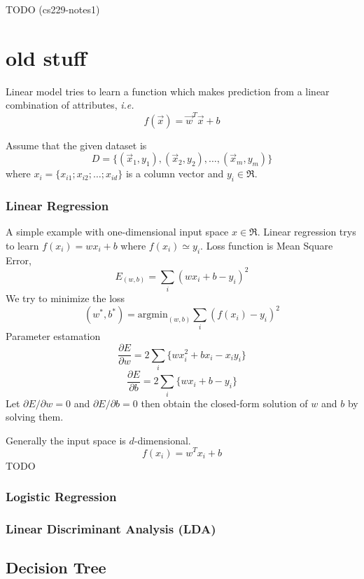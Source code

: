 TODO (cs229-notes1)

\section{old stuff}



 Linear model tries to learn a function which makes prediction from
 a linear combination of attributes, {\it i.e.}
 $$ f(\vec{x}) = \vec{w}^T \vec{x} + b $$

 Assume that the given dataset is
 $$D = \{(\vec{x}_1, y_1), (\vec{x}_2, y_2), \ldots, (\vec{x}_m, y_m)\} $$
 where $x_i=\{x_{i1};x_{i2};\ldots;x_{id}\}$ is a column vector and $y_i \in \Re$.

 \subsubsection{Linear Regression}

 A simple example with one-dimensional input space $x \in \Re$.
 Linear regression trys to learn $f(x_i)=wx_i+b$ where $f(x_i)\simeq y_i$.
 Loss function is Mean Square Error,
 $$E_{(w,b)}=\sum_i (wx_i + b - y_i)^2 $$
 We try to minimize the loss
 $$(w^*,b^*) = \text{argmin}_{(w,b)} \sum_i (f(x_i) - y_i)^2$$
 Parameter estamation
 $$\frac{\partial E}{\partial w} = 2\sum_i \{ wx_i^2 +bx_i -x_iy_i\}$$
 $$\frac{\partial E}{\partial b} = 2\sum_i \{ wx_i   +b    -y_i\}$$
 Let $\partial E/\partial w=0$ and $\partial E/\partial b=0$ then
 obtain the closed-form solution of $w$ and $b$ by solving them.

 Generally the input space is $d$-dimensional.
 $$f(x_i) = w^Tx_i + b$$
 TODO

 \subsubsection{Logistic Regression}

 \subsubsection{Linear Discriminant Analysis (LDA)}

\subsection{Decision Tree}

